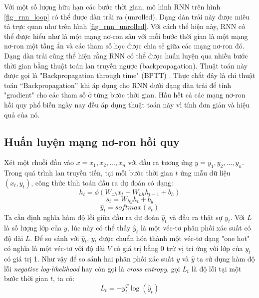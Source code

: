 Với một số lượng hữu hạn các bước thời gian, mô hình RNN trên hình \ref{fig_rnn_loop} có thể được dàn trải ra (unrolled). Dạng dàn trải này được miêu tả trực quan như trên hình \ref{fig_rnn_unrolled}. Với cách thể hiện này, RNN có thể được hiểu như là một mạng nơ-ron sâu với mỗi bước thời gian là một mạng nơ-ron một tầng ẩn và các tham số học được chia sẻ giữa các mạng nơ-ron đó. Dạng dàn trải cũng thể hiện rằng RNN có thể được huấn luyện qua nhiều bước thời gian bằng thuật toán lan truyền ngược (backpropagation). Thuật toán này được gọi là "Backpropagation through time" (BPTT) \cite{werbos1990}. Thực chất đây là chỉ thuật toán “Backpropagation” khi áp dụng cho RNN dưới dạng dàn trải để tính "gradient" cho các tham số ở từng bước thời gian. Hầu hết cả các mạng nơ-ron hồi quy phổ biến ngày nay đều áp dụng thuật toán này vì tính đơn giản và hiệu quả của nó.

\subsection{Huấn luyện mạng nơ-ron hồi quy}

Xét một chuỗi đầu vào $x={x_1,x_2,...,x_n}$ với đầu ra tương ứng $y={y_1,y_2,...,y_n}$. Trong quá trình lan truyền tiến, tại mỗi bước thời gian $t$ ứng mẫu dữ liệu $(x_t, y_t)$, công thức tính toán đầu ra dự đoán có dạng:
\begin{equation} \label{rnnForwardProp1}
	h_t = \phi \left(W_{xh} x_t + W_{hh}h_{t-1} + b_h \right) 
\end{equation}
\begin{equation} \label{rnnForwardProp2}
	s_t = W_{hy} h_t + b_y 
\end{equation}
\begin{equation} \label{rnnForwardProp3}
	\hat{y}_t = softmax (s_t) 
\end{equation}
Ta cần định nghĩa hàm độ lỗi giữa đầu ra dự đoán $\hat{y}_t$ và đầu ra thật sự $y_t$. Với $L$ là số lượng lớp của $y$, lúc này có thể thấy $\hat{y}_t$ là một véc-tơ phân phối xác suất có độ dài $L$. Để so sánh với $\hat{y}_t$, $y_t$ được chuẩn hóa thành một véc-tơ dạng "one hot" có nghĩa là một véc-tơ với độ dài $V$ có giá trị bằng 0 trừ vị trí ứng với lớp của $y_t$ có giá trị 1. Như vậy để so sánh hai phân phối xác suất $y$ và $\hat{y}$ ta sử dụng hàm độ lỗi \textit{negative log-likelihood} hay còn gọi là \textit{cross entropy}, gọi $L_t$ là độ lỗi tại một bước thời gian $t$, ta có:
\begin{equation} \label{errorOfAnExample}
	L_t = -y_t^{T} \log(\hat{y}_t)
\end{equation}

